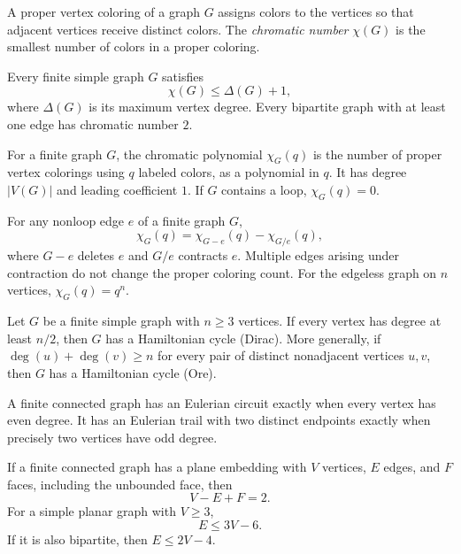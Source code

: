 \begin{definition}
A proper vertex coloring of a graph $G$ assigns colors to the vertices so that adjacent vertices receive distinct colors. The \emph{chromatic number} $\chi(G)$ is the smallest number of colors in a proper coloring.
\end{definition}

\begin{theorem}
Every finite simple graph $G$ satisfies
\[
 \chi(G)\le\Delta(G)+1,
\]
where $\Delta(G)$ is its maximum vertex degree. Every bipartite graph with at least one edge has chromatic number $2$.
\end{theorem}

\begin{definition}
For a finite graph $G$, the chromatic polynomial $\chi_G(q)$ is the number of proper vertex colorings using $q$ labeled colors, as a polynomial in $q$. It has degree $|V(G)|$ and leading coefficient $1$. If $G$ contains a loop, $\chi_G(q)=0$.
\end{definition}

\begin{theorem}
For any nonloop edge $e$ of a finite graph $G$,
\[
 \chi_G(q)=\chi_{G-e}(q)-\chi_{G/e}(q),
\]
where $G-e$ deletes $e$ and $G/e$ contracts $e$. Multiple edges arising under contraction do not change the proper coloring count. For the edgeless graph on $n$ vertices, $\chi_G(q)=q^n$.
\end{theorem}

\begin{theorem}
Let $G$ be a finite simple graph with $n\ge3$ vertices. If every vertex has degree at least $n/2$, then $G$ has a Hamiltonian cycle (Dirac). More generally, if $\deg(u)+\deg(v)\ge n$ for every pair of distinct nonadjacent vertices $u, v$, then $G$ has a Hamiltonian cycle (Ore).
\end{theorem}

\begin{theorem}
A finite connected graph has an Eulerian circuit exactly when every vertex has even degree. It has an Eulerian trail with two distinct endpoints exactly when precisely two vertices have odd degree.
\end{theorem}

\begin{theorem}
If a finite connected graph has a plane embedding with $V$ vertices, $E$ edges, and $F$ faces, including the unbounded face, then
\[
 V-E+F=2.
\]
For a simple planar graph with $V\ge3$,
\[
 E\le3V-6.
\]
If it is also bipartite, then $E\le2V-4$.
\end{theorem}

